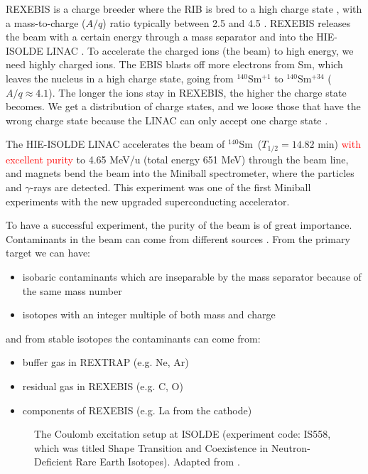\documentclass[twoside,english]{uiofysmaster/uiofysmaster}
\newcommand{\Sm}{$^{140}$Sm} %
\newcommand{\ga}{$\gamma$}
\begin{document}
REXEBIS is a charge breeder where the RIB is bred to a high charge state \cite{REXEBIS}, with a mass-to-charge ($A/q$) ratio typically between 2.5 and 4.5 \cite{Post-acc}. REXEBIS releases the beam with a certain energy through a mass separator and into the HIE-ISOLDE LINAC \cite{HIE-ISOLDE}. To accelerate the charged ions (the beam) to high energy, we need highly charged ions. The EBIS blasts off more electrons from Sm, which leaves the nucleus in a high charge state, going from \Sm$^{+1}$ to \Sm$^{+34}$ ($A/q \approx 4.1$). The longer the ions stay in REXEBIS, the higher the charge state becomes. We get a distribution of charge states, and we loose those that have the wrong charge state because the LINAC can only accept one charge state \cite{REX-web, HIE-web, EBIS2002, EBIS2010}.

The HIE-ISOLDE LINAC accelerates the beam of \Sm\ ($T_{1/2} = 14.82$ min) \textcolor{red}{with excellent purity} to 4.65 MeV/u (total energy 651 MeV) through the beam line, and magnets bend the beam into the Miniball spectrometer, where the particles and \ga-rays are detected. This experiment was one of the first Miniball experiments with the new upgraded superconducting accelerator. 

To have a successful experiment, the purity of the beam is of great importance. Contaminants in the beam can come from different sources  \cite{MB-spect}. From the primary target we can have:
\begin{itemize}
	\item isobaric contaminants which are inseparable by the mass separator because of the same mass number
	\item isotopes with an integer multiple of both mass and charge
\end{itemize}
and from stable isotopes the contaminants can come from:
\begin{itemize}
	\item buffer gas in REXTRAP (e.g. Ne, Ar)
	\item residual gas in REXEBIS (e.g. C, O)
	\item components of REXEBIS (e.g. La from the cathode)
\end{itemize}


\begin{figure}[ht]
	\centering
	
	\caption{The Coulomb excitation setup at ISOLDE (experiment code: IS558, which was titled Shape Transition and Coexistence in Neutron-Deficient Rare Earth Isotopes). Adapted from \cite{Klintefjord}.}
	\label{fig:Coulex}
\end{figure}
\end{document}
